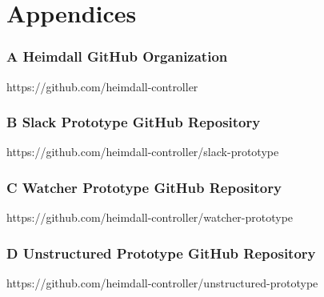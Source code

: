 \documentclass{article}
\begin{document}
\clearpage
\section*{Appendices}
\subsubsection*{A Heimdall GitHub Organization} 
\hypertarget{appendix-a}{https://github.com/heimdall-controller}

\subsubsection*{B Slack Prototype GitHub Repository} 
\hypertarget{appendix-b}{https://github.com/heimdall-controller/slack-prototype}

\subsubsection*{C Watcher Prototype GitHub Repository} 
\hypertarget{appendix-c}{https://github.com/heimdall-controller/watcher-prototype}

\subsubsection*{D Unstructured Prototype GitHub Repository} 
\hypertarget{appendix-d}{https://github.com/heimdall-controller/unstructured-prototype}
\end{document}
